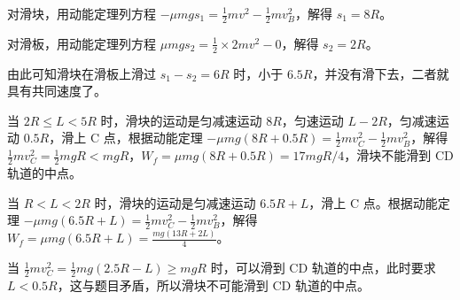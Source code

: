 \documentclass[\gkver]{gaokaozhenti}
\begin{document}
\begin{enumerate}
{对滑块，用动能定理列方程 $-\mu mgs_{1}=\frac{1}{2}mv^{2}-\frac{1}{2}mv_{B}^{2}$，解得 $s_{1}=8R$。

对滑板，用动能定理列方程 $\mu mgs_{2}=\frac{1}{2}\times2mv^{2}-0$，解得 $s_{2}=2R$。

由此可知滑块在滑板上滑过 $s_{1} - s_{2} = 6R$ 时，小于 $6.5R$，并没有滑下去，二者就具有共同速度了。

当 $2R \leqslant L < 5R$ 时，滑块的运动是匀减速运动 $8R$，匀速运动 $L - 2R$，匀减速运动 $0.5R$，滑上 C 点，根据动能定理 $-\mu mg(8R + 0.5R) = \frac{1}{2}mv_{C}^{2} - \frac{1}{2}mv_{B}^{2}$，解得 $\frac{1}{2}mv_{C}^{2} = \frac{1}{2}mgR < mgR$，$W_{f} = \mu mg(8R + 0.5R) = 17mgR/4$，滑块不能滑到 CD 轨道的中点。

当 $R < L < 2R$ 时，滑块的运动是匀减速运动 $6.5R + L$，滑上 C 点。根据动能定理 $-\mu mg(6.5R+L)=\frac{1}{2}mv_{C}^{2}-\frac{1}{2}mv_{B}^{2}$，解得 $W_{f}=\mu mg(6.5R+L)=\frac{mg(13R+2L)}{4}$。

当 $\frac{1}{2}mv_{C}^{2}=\frac{1}{2}mg(2.5R-L)\geq mgR$ 时，可以滑到 CD 轨道的中点，此时要求 $L<0.5R$，这与题目矛盾，所以滑块不可能滑到 CD 轨道的中点。
}

\end{enumerate}
\end{document}
